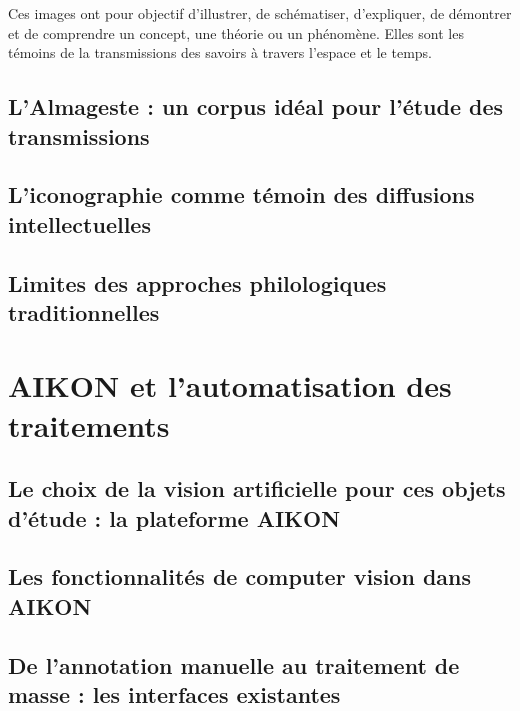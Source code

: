 \documentclass[a4paper,12pt,twoside]{book}
\newcommand{\clearemptydoublepage}{\newpage{\pagestyle{empty}\cleardoublepage}}
\begin{document}
	Ces images ont pour objectif d'illustrer, de schématiser, d'expliquer, de démontrer et de comprendre un concept, une théorie ou un phénomène. Elles sont les témoins de la transmissions des savoirs à travers l'espace et le temps.
	
	
	\section[Un corpus idéal pour l'étude des transmissions]{L'Almageste : un corpus idéal pour l'étude des transmissions}
	

	
	
	
	\section[L'iconographie témoin des diffusions intellectuelles]{L'iconographie comme témoin des diffusions intellectuelles}


	


	
	\section{Limites des approches philologiques traditionnelles}
	
	
	
	
	\clearemptydoublepage
	
	\chapter{AIKON et l'automatisation des traitements}
	
	\section[La plateforme AIKON]{Le choix de la vision artificielle pour ces objets d'étude : la plateforme AIKON}
	
	 
	


	
	\section{Les fonctionnalités de computer vision dans AIKON}
	
	
	\section[Les interfaces existantes]{De l'annotation manuelle au traitement de masse : les interfaces existantes}
	
	
\end{document}
